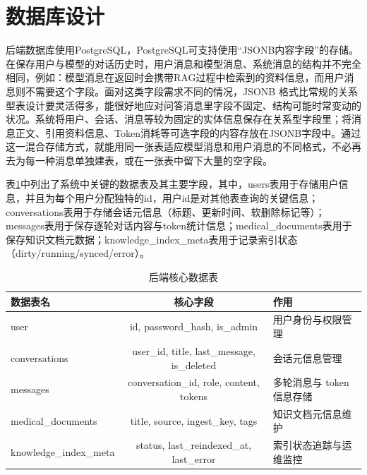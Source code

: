 \section{数据库设计}

后端数据库使用PostgreSQL，PostgreSQL可支持使用“JSONB内容字段”的存储。在保存用户与模型的对话历史时，用户消息和模型消息、系统消息的结构并不完全相同，例如：模型消息在返回时会携带RAG过程中检索到的资料信息，而用户消息则不需要这个字段。面对这类字段需求不同的情况，JSONB 格式比常规的关系型表设计要灵活得多，能很好地应对问答消息里字段不固定、结构可能时常变动的状况。系统将用户、会话、消息等较为固定的实体信息保存在关系型字段里；将消息正文、引用资料信息、Token消耗等可选字段的内容存放在JSONB字段中。通过这一混合存储方式，就能用同一张表适应模型消息和用户消息的不同格式，不必再去为每一种消息单独建表，或在一张表中留下大量的空字段。  

表\ref{tab:backend-core-tables}中列出了系统中关键的数据表及其主要字段，其中，users表用于存储用户信息，并且为每个用户分配独特的id，用户id是对其他表查询的关键信息；conversations表用于存储会话元信息（标题、更新时间、软删除标记等）；messages表用于保存逐轮对话内容与token统计信息；medical\_documents表用于保存知识文档元数据；knowledge\_index\_meta表用于记录索引状态（dirty/running/synced/error）。

\begin{table}[htbp]
    \centering
    \caption{后端核心数据表}
    
    \setlength{\tabcolsep}{8pt} %
    
    \begin{tabular}{l c p{5cm}} %
        \toprule
        数据表名 & 核心字段 & 作用 \\
        \midrule
        user & id, password\_hash, is\_admin & 用户身份与权限管理 \\
        conversations & user\_id, title, last\_message, is\_deleted & 会话元信息管理 \\
        messages & conversation\_id, role, content, tokens & 多轮消息与 token 信息存储 \\
        medical\_documents  &  title, source, ingest\_key, tags &  知识文档元信息维护 \\
        knowledge\_index\_meta  &  status, last\_reindexed\_at, last\_error  &  索引状态追踪与运维监控 \\
        \bottomrule
    \end{tabular}
    \label{tab:backend-core-tables}
\end{table}

